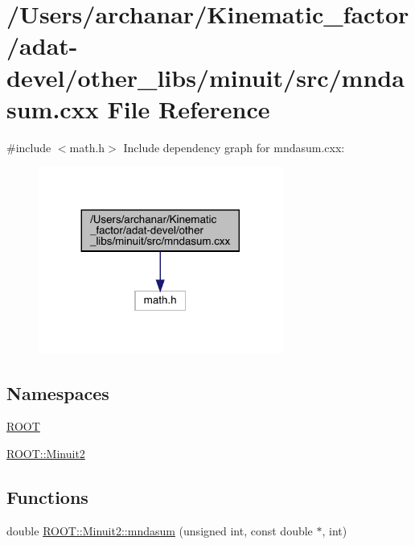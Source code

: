 \hypertarget{adat-devel_2other__libs_2minuit_2src_2mndasum_8cxx}{}\section{/\+Users/archanar/\+Kinematic\+\_\+factor/adat-\/devel/other\+\_\+libs/minuit/src/mndasum.cxx File Reference}
\label{adat-devel_2other__libs_2minuit_2src_2mndasum_8cxx}
{\ttfamily \#include $<$math.\+h$>$}\newline
Include dependency graph for mndasum.\+cxx\+:
\nopagebreak
\begin{figure}[H]
\begin{center}
\leavevmode
\includegraphics[width=227pt]{d4/d19/adat-devel_2other__libs_2minuit_2src_2mndasum_8cxx__incl}
\end{center}
\end{figure}
\subsection*{Namespaces}
\begin{DoxyCompactItemize}
\item 
 \mbox{\hyperlink{namespaceROOT}{R\+O\+OT}}
\item 
 \mbox{\hyperlink{namespaceROOT_1_1Minuit2}{R\+O\+O\+T\+::\+Minuit2}}
\end{DoxyCompactItemize}
\subsection*{Functions}
\begin{DoxyCompactItemize}
\item 
double \mbox{\hyperlink{namespaceROOT_1_1Minuit2_a6945787dc86a55296d0de1bf1fefc508}{R\+O\+O\+T\+::\+Minuit2\+::mndasum}} (unsigned int, const double $\ast$, int)
\end{DoxyCompactItemize}
